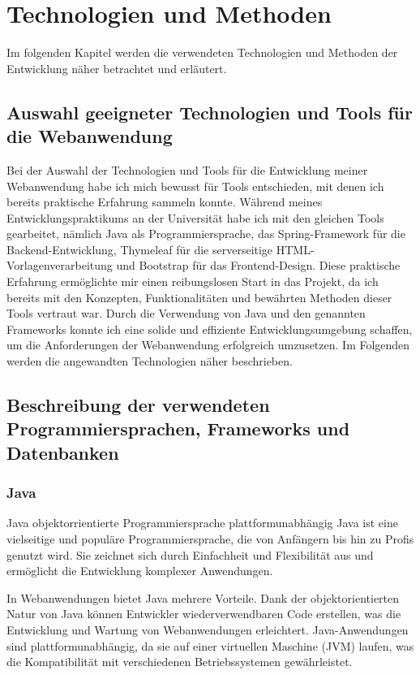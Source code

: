 \documentclass[fontsize=12pt,openright,oneside,paper=a4,BCOR=1cm]{scrbook}
\begin{document}
%
%
\renewcommand{\cleardoublepage}{}
\chapter{Technologien und Methoden}

Im folgenden Kapitel werden die verwendeten Technologien und Methoden der Entwicklung näher betrachtet und erläutert.

\section{Auswahl geeigneter Technologien und Tools für die Webanwendung}


Bei der Auswahl der Technologien und Tools für die Entwicklung meiner Webanwendung habe ich mich bewusst für Tools entschieden, mit denen ich bereits praktische Erfahrung sammeln konnte. Während meines Entwicklungspraktikums an der Universität habe ich mit den gleichen Tools gearbeitet, nämlich Java als Programmiersprache, das Spring-Framework für die Backend-Entwicklung, Thymeleaf für die serverseitige HTML-Vorlagenverarbeitung und Bootstrap für das Frontend-Design. Diese praktische Erfahrung ermöglichte mir einen reibungslosen Start in das Projekt, da ich bereits mit den Konzepten, Funktionalitäten und bewährten Methoden dieser Tools vertraut war. Durch die Verwendung von Java und den genannten Frameworks konnte ich eine solide und effiziente Entwicklungsumgebung schaffen, um die Anforderungen der Webanwendung erfolgreich umzusetzen.
Im Folgenden werden die angewandten Technologien näher beschrieben.

\section{Beschreibung der verwendeten Programmiersprachen, Frameworks und Datenbanken}

\subsection{Java}
Java objektorrientierte Programmiersprache 
plattformunabhängig
Java ist eine vielseitige und populäre Programmiersprache, die von Anfängern bis hin zu Profis genutzt wird. Sie zeichnet sich durch Einfachheit und Flexibilität aus und ermöglicht die Entwicklung komplexer Anwendungen.

In Webanwendungen bietet Java mehrere Vorteile. Dank der objektorientierten Natur von Java können Entwickler wiederverwendbaren Code erstellen, was die Entwicklung und Wartung von Webanwendungen erleichtert. Java-Anwendungen sind plattformunabhängig, da sie auf einer virtuellen Maschine (JVM) laufen, was die Kompatibilität mit verschiedenen Betriebssystemen gewährleistet.
\end{document}
